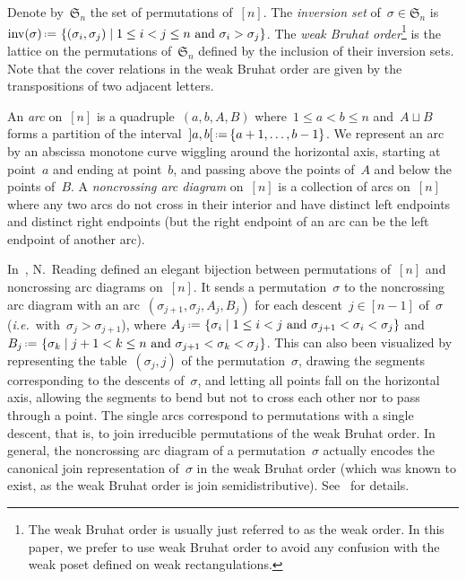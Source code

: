 \documentclass{amsart}
\theoremstyle{definition}
\newcommand{\f}[1]{\mathfrak{#1}} %
\newcommand{\set}[2]{\left\{ #1 \;\middle|\; #2 \right\}} %
\newcommand{\eqdef}{\mbox{\,\raisebox{0.2ex}{\scriptsize\ensuremath{\mathrm:}}\ensuremath{=}\,}} %
\DeclareMathOperator{\inv}{inv} %
\newcommand{\ie}{\textit{i.e.}~} %
\newcommand{\darkblue}{\color{darkblue}} %
\newcommand{\defn}[1]{\textsl{\darkblue #1}} %
\begin{document}
Denote by~$\f{S}_n$ the set of permutations of~$[n]$.
The \defn{inversion set} of~$\sigma \in \f{S}_n$ is~$\inv(\sigma) \eqdef \set{(\sigma_i, \sigma_j)}{1 \le i < j \le n \text{ and } \sigma_i > \sigma_j}$.
The \defn{weak Bruhat order}\footnote{The weak Bruhat order is usually just referred to as the weak order. In this paper, we prefer to use weak Bruhat order to avoid any confusion with the weak poset defined on weak rectangulations.} is the lattice on the permutations of~$\f{S}_n$ defined by the inclusion of their inversion sets.
Note that the cover relations in the weak Bruhat order are given by the transpositions of two adjacent letters.

An \defn{arc} on~$[n]$ is a quadruple~$(a, b, A, B)$ where~$1 \le a < b \le n$ and~$A \sqcup B$ forms a partition of the interval~${]a,b[} \eqdef \{a+1, \dots, b-1\}$.
We represent an arc by an abscissa monotone curve wiggling around the horizontal axis, starting at point~$a$ and ending at point~$b$, and passing above the points of~$A$ and below the points of~$B$.
A \defn{noncrossing arc diagram} on~$[n]$ is a collection of arcs on~$[n]$ where any two arcs do not cross in their interior and have distinct left endpoints and distinct right endpoints (but the right endpoint of an arc can be the left endpoint of another arc).

In~\cite{Reading-arcDiagrams}, N.~Reading defined an elegant bijection between permutations of~$[n]$ and noncrossing arc diagrams on~$[n]$.
It sends a permutation~$\sigma$ to the noncrossing arc diagram with an arc~$(\sigma_{j+1}, \sigma_j, A_j, B_j)$ for each descent~$j \in [n-1]$ of~$\sigma$ (\ie with~$\sigma_j > \sigma_{j+1}$), where \linebreak $A_j \eqdef \set{\sigma_i}{1 \le i < j \text{ and } \sigma_{j+1} < \sigma_i < \sigma_j}$ and~$B_j \eqdef \set{\sigma_k}{j+1 < k \le n \text{ and } \sigma_{j+1} < \sigma_k < \sigma_j}$. \linebreak
This can also been visualized by representing the table~$(\sigma_j,j)$ of the permutation~$\sigma$, drawing the segments corresponding to the descents of~$\sigma$, and letting all points fall on the horizontal axis, allowing the segments to bend but not to cross each other nor to pass through a point.
The single arcs correspond to permutations with a single descent, that is, to join irreducible permutations of the weak Bruhat order.
In general, the noncrossing arc diagram of a permutation~$\sigma$ actually encodes the canonical join representation of~$\sigma$ in the weak Bruhat order (which was known to exist, as the weak Bruhat order is join semidistributive).
See~\cite{Reading-arcDiagrams} for details.
\end{document}
